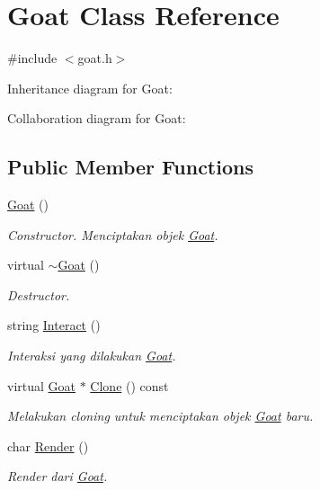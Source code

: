 \hypertarget{classGoat}{}\section{Goat Class Reference}
\label{classGoat}


{\ttfamily \#include $<$goat.\+h$>$}



Inheritance diagram for Goat\+:


Collaboration diagram for Goat\+:
\subsection*{Public Member Functions}
\begin{DoxyCompactItemize}
\item 
\hyperlink{classGoat_acf506b76c8503c9749df191a92dc99f9}{Goat} ()
\begin{DoxyCompactList}\small\item\em Constructor. Menciptakan objek \hyperlink{classGoat}{Goat}. \end{DoxyCompactList}\item 
virtual \hyperlink{classGoat_a47af45317eec8718356b20a10e31af27}{$\sim$\+Goat} ()
\begin{DoxyCompactList}\small\item\em Destructor. \end{DoxyCompactList}\item 
string \hyperlink{classGoat_a5f480d88c50724cee8c7a9d18f486144}{Interact} ()
\begin{DoxyCompactList}\small\item\em Interaksi yang dilakukan \hyperlink{classGoat}{Goat}. \end{DoxyCompactList}\item 
virtual \hyperlink{classGoat}{Goat} $\ast$ \hyperlink{classGoat_a1532200ef20734bb42d0a1306b14d8ad}{Clone} () const 
\begin{DoxyCompactList}\small\item\em Melakukan cloning untuk menciptakan objek \hyperlink{classGoat}{Goat} baru. \end{DoxyCompactList}\item 
char \hyperlink{classGoat_aedea4680fe17571c2f51d35b90397f6e}{Render} ()
\begin{DoxyCompactList}\small\item\em Render dari \hyperlink{classGoat}{Goat}. \end{DoxyCompactList}\end{DoxyCompactItemize}

